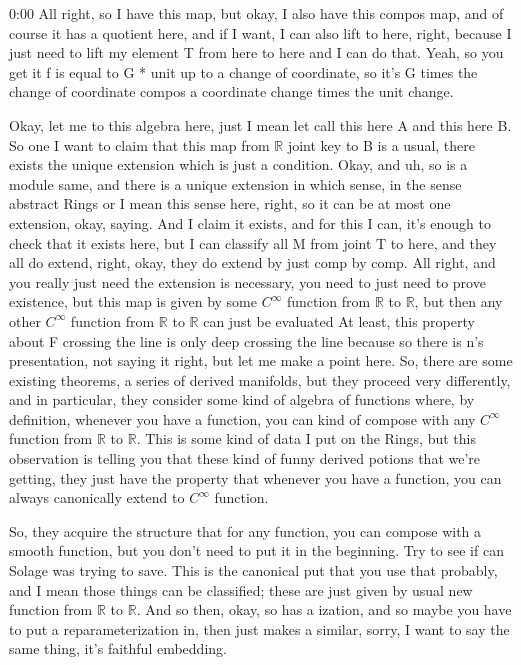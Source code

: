 \begin{unfinished}{0:00}
All right, so I have this map, but okay, I also have this compos map, and of course it has a quotient here, and if I want, I can also lift to here, right, because I just need to lift my element T from here to here and I can do that. Yeah, so you get it f is equal to G * unit up to a change of coordinate, so it's G times the change of coordinate compos a coordinate change times the unit change.

Okay, let me to this algebra here, just I mean let call this here A and this here B. So one I want to claim that this map from $\mathbb{R}$ joint key to B is a usual, there exists the unique extension which is just a condition. Okay, and uh, so is a module same, and there is a unique extension in which sense, in the sense abstract Rings or I mean this sense here, right, so it can be at most one extension, okay, saying. And I claim it exists, and for this I can, it's enough to check that it exists here, but I can classify all M from joint T to here, and they all do extend, right, okay, they do extend by just comp by comp. All right, and you really just need the extension is necessary, you need to just need to prove existence, but this map is given by some $C^\infty$ function from $\mathbb{R}$ to $\mathbb{R}$, but then any other $C^\infty$ function from $\mathbb{R}$ to $\mathbb{R}$ can just be evaluated
At least, this property about F crossing the line is only deep crossing the line because so there is n's presentation, not saying it right, but let me make a point here. So, there are some existing theorems, a series of derived manifolds, but they proceed very differently, and in particular, they consider some kind of algebra of functions where, by definition, whenever you have a function, you can kind of compose with any $C^\infty$ function from $\mathbb{R}$ to $\mathbb{R}$. This is some kind of data I put on the Rings, but this observation is telling you that these kind of funny derived potions that we're getting, they just have the property that whenever you have a function, you can always canonically extend to $C^\infty$ function. 

So, they acquire the structure that for any function, you can compose with a smooth function, but you don't need to put it in the beginning. Try to see if can Solage was trying to save. This is the canonical put that you use that probably, and I mean those things can be classified; these are just given by usual new function from $\mathbb{R}$ to $\mathbb{R}$. And so then, okay, so has a ization, and so maybe you have to put a reparameterization in, then just makes a similar, sorry, I want to say the same thing, it's faithful embedding. 


\end{unfinished}
